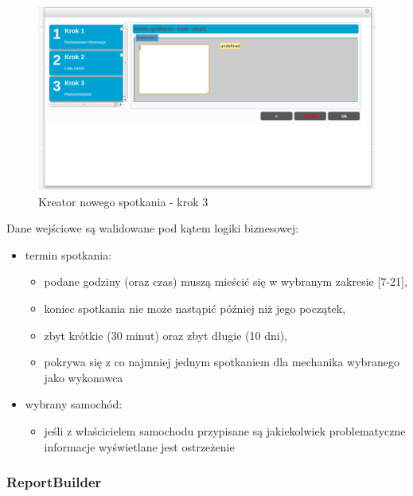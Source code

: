 		\begin{figure}[H]
			\centering
			\includegraphics[width=1.0\textwidth]{images/newAppointment_step3}
			\caption[Kreator nowego spotkania - krok 3]{
				Kreator nowego spotkania - krok 3
			}
			\label{app:wizard_newAppointment_step3}
		\end{figure}		
		Dane wejściowe są walidowane pod kątem logiki biznesowej:
		\begin{itemize}
			\item termin spotkania:
			\begin{itemize}
				\item podane godziny (oraz czas) muszą mieścić się w wybranym zakresie [7-21],
				\item koniec spotkania nie może nastąpić później niż jego początek,
				\item zbyt krótkie (30 minut) oraz zbyt długie (10 dni),
				\item pokrywa się z co najmniej jednym spotkaniem dla mechanika wybranego jako wykonawca
			\end{itemize} 
			\item wybrany samochód:
			\begin{itemize}
				\item jeśli z właścicielem samochodu przypisane są jakiekolwiek problematyczne informacje wyświetlane jest ostrzeżenie
			\end{itemize}
		\end{itemize}

	\subsubsection{ReportBuilder}
		
